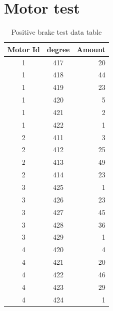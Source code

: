\chapter{Motor test}
\label{app:motor_test}
\begin{table}
  \centering
  \begin{tabular}{| c | c | r | }
    \hline
    Motor Id & degree & Amount \\ \hline
    1 & 417 & 20 \\ \hline
    1 & 418 & 44 \\ \hline
    1 & 419 & 23 \\ \hline
    1 & 420 & 5 \\ \hline
    1 & 421 & 2 \\ \hline
    1 & 422 & 1 \\ \hline
    2 & 411 & 3 \\ \hline
    2 & 412 & 25 \\ \hline
    2 & 413 & 49 \\ \hline
    2 & 414 & 23 \\ \hline
    3 & 425 & 1 \\ \hline
    3 & 426 & 23 \\ \hline
    3 & 427 & 45 \\ \hline
    3 & 428 & 36 \\ \hline
    3 & 429 & 1 \\ \hline
    4 & 420 & 4 \\ \hline
    4 & 421 & 20 \\ \hline
    4 & 422 & 46 \\ \hline
    4 & 423 & 29 \\ \hline
    4 & 424 & 1 \\ \hline
  \end{tabular}
  \caption{Positive brake test data table}
  \label{tbl:cmpl_test_data}
\end{table}

